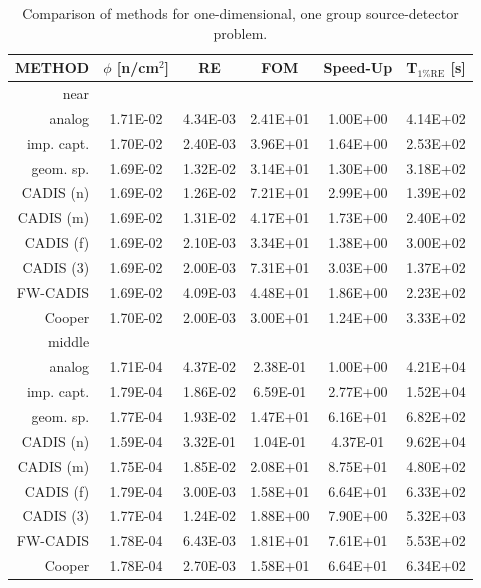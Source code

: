\documentclass[letter,11pt]{article}
\begin{document}
\begin{table}[!]
 \caption{Comparison of methods for one-dimensional, one group source-detector problem.}
 \begin{center} 
 \small{
 \begin{tabular*}{0.90\textwidth}{@{\extracolsep{\fill}} rccccc } 
  \toprule 
   {\sc METHOD}  &  $\phi$ [n/cm$^2$]  &  {\sc RE} & {\sc FOM} &  {\sc Speed-Up} & {\sc T$_{\mathrm{1\% RE}}$ [s]} \\
  \midrule 
   {\sc near}   &  & & & &  \\
  \midrule
   analog      & 1.71E-02 & 4.34E-03 & 2.41E+01 & 1.00E+00 & 4.14E+02 \\
   imp. capt.  & 1.70E-02 & 2.40E-03 & 3.96E+01 & 1.64E+00 & 2.53E+02 \\
   geom. sp.   & 1.69E-02 & 1.32E-02 & 3.14E+01 & 1.30E+00 & 3.18E+02 \\
   CADIS (n)   & 1.69E-02 & 1.26E-02 & 7.21E+01 & 2.99E+00 & 1.39E+02 \\
   CADIS (m)   & 1.69E-02 & 1.31E-02 & 4.17E+01 & 1.73E+00 & 2.40E+02 \\
   CADIS (f)   & 1.69E-02 & 2.10E-03 & 3.34E+01 & 1.38E+00 & 3.00E+02 \\
   CADIS (3)   & 1.69E-02 & 2.00E-03 & 7.31E+01 & 3.03E+00 & 1.37E+02 \\
   FW-CADIS    & 1.69E-02 & 4.09E-03 & 4.48E+01 & 1.86E+00 & 2.23E+02 \\
   Cooper      & 1.70E-02 & 2.00E-03 & 3.00E+01 & 1.24E+00 & 3.33E+02 \\
  \midrule 
   {\sc middle}   &  & & & & \\
  \midrule
   analog      & 1.71E-04 & 4.37E-02 & 2.38E-01 & 1.00E+00 & 4.21E+04 \\
   imp. capt.  & 1.79E-04 & 1.86E-02 & 6.59E-01 & 2.77E+00 & 1.52E+04 \\
   geom. sp.   & 1.77E-04 & 1.93E-02 & 1.47E+01 & 6.16E+01 & 6.82E+02 \\
   CADIS (n)   & 1.59E-04 & 3.32E-01 & 1.04E-01 & 4.37E-01 & 9.62E+04 \\
   CADIS (m)   & 1.75E-04 & 1.85E-02 & 2.08E+01 & 8.75E+01 & 4.80E+02 \\
   CADIS (f)   & 1.79E-04 & 3.00E-03 & 1.58E+01 & 6.64E+01 & 6.33E+02 \\
   CADIS (3)   & 1.77E-04 & 1.24E-02 & 1.88E+00 & 7.90E+00 & 5.32E+03 \\
   FW-CADIS    & 1.78E-04 & 6.43E-03 & 1.81E+01 & 7.61E+01 & 5.53E+02 \\
   Cooper      & 1.78E-04 & 2.70E-03 & 1.58E+01 & 6.64E+01 & 6.34E+02 \\

\end{tabular*}}
\end{center}
\end{table}
\end{document}
